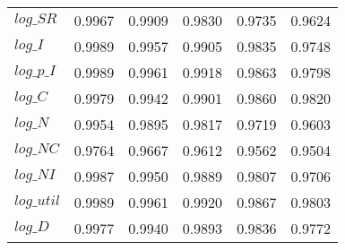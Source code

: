 \begin{center}
\begin{longtable}{lccccc}
$log\_SR    $	 & 	     0.9967	 & 	     0.9909	 & 	     0.9830	 & 	     0.9735	 & 	     0.9624 \\ 
$log\_I     $	 & 	     0.9989	 & 	     0.9957	 & 	     0.9905	 & 	     0.9835	 & 	     0.9748 \\ 
$log\_p\_I  $	 & 	     0.9989	 & 	     0.9961	 & 	     0.9918	 & 	     0.9863	 & 	     0.9798 \\ 
$log\_C     $	 & 	     0.9979	 & 	     0.9942	 & 	     0.9901	 & 	     0.9860	 & 	     0.9820 \\ 
$log\_N     $	 & 	     0.9954	 & 	     0.9895	 & 	     0.9817	 & 	     0.9719	 & 	     0.9603 \\ 
$log\_NC    $	 & 	     0.9764	 & 	     0.9667	 & 	     0.9612	 & 	     0.9562	 & 	     0.9504 \\ 
$log\_NI    $	 & 	     0.9987	 & 	     0.9950	 & 	     0.9889	 & 	     0.9807	 & 	     0.9706 \\ 
$log\_util  $	 & 	     0.9989	 & 	     0.9961	 & 	     0.9920	 & 	     0.9867	 & 	     0.9803 \\ 
$log\_D     $	 & 	     0.9977	 & 	     0.9940	 & 	     0.9893	 & 	     0.9836	 & 	     0.9772 \\ 
\end{longtable}
 \end{center}

